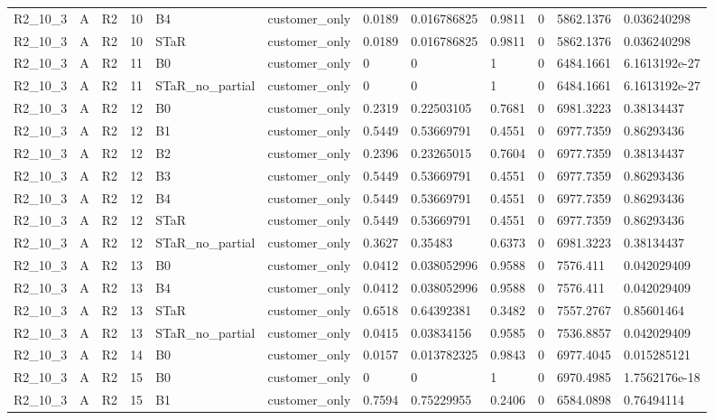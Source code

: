 \begin{longtable}{llllllllllll}
R2\_10\_3 & A & R2 & 10 & B4 & customer\_only & 0.0189 & 0.016786825 & 0.9811 & 0 & 5862.1376 & 0.036240298 \\
R2\_10\_3 & A & R2 & 10 & STaR & customer\_only & 0.0189 & 0.016786825 & 0.9811 & 0 & 5862.1376 & 0.036240298 \\
R2\_10\_3 & A & R2 & 11 & B0 & customer\_only & 0 & 0 & 1 & 0 & 6484.1661 & 6.1613192e-27 \\
R2\_10\_3 & A & R2 & 11 & STaR\_no\_partial & customer\_only & 0 & 0 & 1 & 0 & 6484.1661 & 6.1613192e-27 \\
R2\_10\_3 & A & R2 & 12 & B0 & customer\_only & 0.2319 & 0.22503105 & 0.7681 & 0 & 6981.3223 & 0.38134437 \\
R2\_10\_3 & A & R2 & 12 & B1 & customer\_only & 0.5449 & 0.53669791 & 0.4551 & 0 & 6977.7359 & 0.86293436 \\
R2\_10\_3 & A & R2 & 12 & B2 & customer\_only & 0.2396 & 0.23265015 & 0.7604 & 0 & 6977.7359 & 0.38134437 \\
R2\_10\_3 & A & R2 & 12 & B3 & customer\_only & 0.5449 & 0.53669791 & 0.4551 & 0 & 6977.7359 & 0.86293436 \\
R2\_10\_3 & A & R2 & 12 & B4 & customer\_only & 0.5449 & 0.53669791 & 0.4551 & 0 & 6977.7359 & 0.86293436 \\
R2\_10\_3 & A & R2 & 12 & STaR & customer\_only & 0.5449 & 0.53669791 & 0.4551 & 0 & 6977.7359 & 0.86293436 \\
R2\_10\_3 & A & R2 & 12 & STaR\_no\_partial & customer\_only & 0.3627 & 0.35483 & 0.6373 & 0 & 6981.3223 & 0.38134437 \\
R2\_10\_3 & A & R2 & 13 & B0 & customer\_only & 0.0412 & 0.038052996 & 0.9588 & 0 & 7576.411 & 0.042029409 \\
R2\_10\_3 & A & R2 & 13 & B4 & customer\_only & 0.0412 & 0.038052996 & 0.9588 & 0 & 7576.411 & 0.042029409 \\
R2\_10\_3 & A & R2 & 13 & STaR & customer\_only & 0.6518 & 0.64392381 & 0.3482 & 0 & 7557.2767 & 0.85601464 \\
R2\_10\_3 & A & R2 & 13 & STaR\_no\_partial & customer\_only & 0.0415 & 0.03834156 & 0.9585 & 0 & 7536.8857 & 0.042029409 \\
R2\_10\_3 & A & R2 & 14 & B0 & customer\_only & 0.0157 & 0.013782325 & 0.9843 & 0 & 6977.4045 & 0.015285121 \\
R2\_10\_3 & A & R2 & 15 & B0 & customer\_only & 0 & 0 & 1 & 0 & 6970.4985 & 1.7562176e-18 \\
R2\_10\_3 & A & R2 & 15 & B1 & customer\_only & 0.7594 & 0.75229955 & 0.2406 & 0 & 6584.0898 & 0.76494114 \\

\end{longtable}
